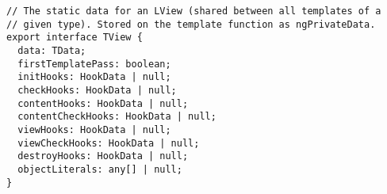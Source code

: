 \begin{verbatim}
// The static data for an LView (shared between all templates of a
// given type). Stored on the template function as ngPrivateData.
export interface TView {
  data: TData;
  firstTemplatePass: boolean;
  initHooks: HookData | null;
  checkHooks: HookData | null;
  contentHooks: HookData | null;
  contentCheckHooks: HookData | null;
  viewHooks: HookData | null;
  viewCheckHooks: HookData | null;
  destroyHooks: HookData | null;
  objectLiterals: any[] | null;
}
\end{verbatim}
